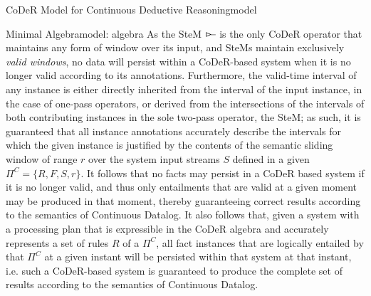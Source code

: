 \begin{nestedsection}{CoDeR Model for Continuous Deductive Reasoning}{model}
\begin{nestedsection}{Minimal Algebra}{model: algebra}
		As the SteM $\rstreamjoin$ is the only CoDeR operator that maintains any form of window over its input, and SteMs maintain exclusively \emph{valid windows}, no data will persist within a CoDeR-based system when it is no longer valid according to its annotations.
		Furthermore, the valid-time interval of any instance is either directly inherited from the interval of the input instance, in the case of one-pass operators, or derived from the intersections of the intervals of both contributing instances in the sole two-pass operator, the SteM;
		as such, it is guaranteed that all instance annotations accurately describe the intervals for which the given instance is justified by the contents of the semantic sliding window of range $r$ over the system input streams $S$ defined in a given ${\Pi^C = \{R,F,S,r\}}$.
		It follows that no facts may persist in a CoDeR based system if it is no longer valid, and thus only entailments that are valid at a given moment may be produced in that moment, thereby guaranteeing correct results according to the semantics of Continuous Datalog.
		It also follows that, given a system with a processing plan that is expressible in the CoDeR algebra and accurately represents a set of rules $R$ of a $\Pi^C$, all fact instances that are logically entailed by that $\Pi^C$ at a given instant will be persisted within that system at that instant,
		i.e. such a CoDeR-based system is guaranteed to produce the complete set of results according to the semantics of Continuous Datalog.
	\end{nestedsection}
\end{nestedsection}